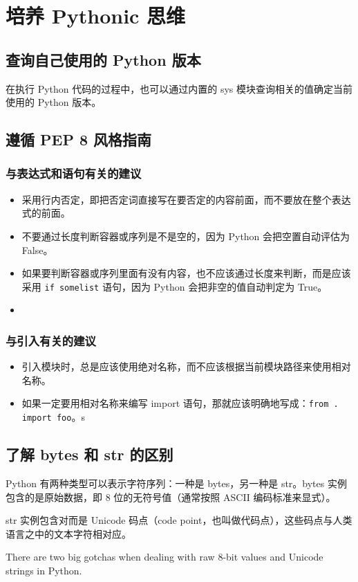 \chapter{培养 Pythonic 思维\label{ch01}}
\section{查询自己使用的 Python 版本}
在执行 Python 代码的过程中，也可以通过内置的 sys 模块查询相关的值确定当前使用的 Python 版本。
\section{遵循 PEP 8 风格指南}
\subsection*{与表达式和语句有关的建议}
\begin{itemize}
    \item 采用行内否定，即把否定词直接写在要否定的内容前面，而不要放在整个表达式的前面。
    \item 不要通过长度判断容器或序列是不是空的，因为 Python 会把空置自动评估为 False。
    \item 如果要判断容器或序列里面有没有内容，也不应该通过长度来判断，而是应该采用 \verb|if somelist| 语句，因为 Python 会把非空的值自动判定为 True。
    \item
\end{itemize}
\subsection*{与引入有关的建议}
\begin{itemize}
    \item 引入模块时，总是应该使用绝对名称，而不应该根据当前模块路径来使用相对名称。
    \item 如果一定要用相对名称来编写 import 语句，那就应该明确地写成：\verb|from . import foo|。s
\end{itemize}
\section{了解 bytes 和 str 的区别}
Python 有两种类型可以表示字符序列：一种是 bytes，另一种是 str。bytes 实例包含的是原始数据，即 8 位的无符号值（通常按照 ASCII 编码标准来显式）。

str 实例包含对而是 Unicode 码点（code point，也叫做代码点），这些码点与人类语言之中的文本字符相对应。

There are two big gotchas when dealing with raw 8-bit values and Unicode strings in Python.

